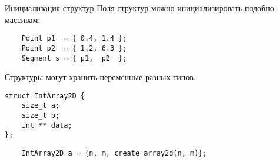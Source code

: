 \documentclass{beamer}
\begin{document}
\begin{frame}[fragile]{Инициализация структур}
Поля структур можно инициализировать подобно массивам:
\begin{lstlisting}
    Point p1  = { 0.4, 1.4 };
    Point p2  = { 1.2, 6.3 };
    Segment s = { p1,  p2  };
\end{lstlisting}
Структуры могут хранить переменные разных типов.
\begin{lstlisting}
struct IntArray2D {
    size_t a;
    size_t b;
    int ** data;
};
\end{lstlisting}
\begin{lstlisting}
    IntArray2D a = {n, m, create_array2d(n, m)};
\end{lstlisting}
\end{frame}
\end{document}
